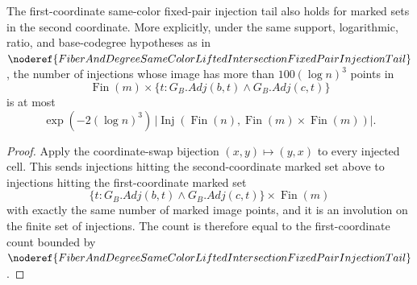 \begin{helper}
The first-coordinate same-color fixed-pair injection tail also holds for
marked sets in the second coordinate.  More explicitly, under the same
support, logarithmic, ratio, and base-codegree hypotheses as in
\(\noderef{FiberAndDegreeSameColorLiftedIntersectionFixedPairInjectionTail}\),
the number of injections whose image has more than
\(100(\log n)^3\) points in
\[
\operatorname{Fin}(m)\times
\{t:G_B.Adj(b,t)\land G_B.Adj(c,t)\}
\]
is at most
\[
\exp(-2(\log n)^3)\,
|\operatorname{Inj}(\operatorname{Fin}(n),
\operatorname{Fin}(m)\times\operatorname{Fin}(m))|.
\]
\end{helper}
\begin{proof}
Apply the coordinate-swap bijection \((x,y)\mapsto(y,x)\) to every injected
cell.  This sends injections hitting the second-coordinate marked set above
to injections hitting the first-coordinate marked set
\[
\{t:G_B.Adj(b,t)\land G_B.Adj(c,t)\}\times \operatorname{Fin}(m)
\]
with exactly the same number of marked image points, and it is an involution
on the finite set of injections.  The count is therefore equal to the
first-coordinate count bounded by
\(\noderef{FiberAndDegreeSameColorLiftedIntersectionFixedPairInjectionTail}\).
\end{proof}

